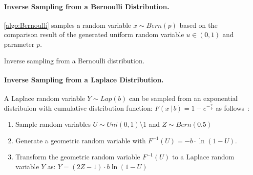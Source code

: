\paragraph{Inverse Sampling from a Bernoulli Distribution.}
\label{SamplingfromaBernoulliDistribution}
\autoref{algo:Bernoulli} samples a random variable $x\sim Bern\left(p\right) $ based on the comparison result of the generated uniform random variable $u \in \left(0,1\right) $ and parameter $p$.

\begin{algorithm}[tbh!]
    \centering
    \caption{Inverse sampling from a Bernoulli distribution.}
    \label{algo:Bernoulli}
\end{algorithm}
\FloatBarrier

\paragraph{Inverse Sampling from a Laplace Distribution.}
\label{algo:InverseTransform-BasedLaplaceSamplingMethod}
A Laplace random variable $Y\sim Lap\left(b\right) $ can be sampled from an exponential distribuion with cumulative distribution function: $F\left(x\,|\, b\right) =1-e^{-\frac{x}{b}}$ as follows~\cite{mironov2012significance}:
\begin{enumerate}
    \item Sample random variables $U\sim Uni\left(0,1\right)\setminus 1 $ and $Z \sim Bern\left(0.5\right) $
    \item Generate a geometric random variable with $  F^{-1}\left(U\right) =-b \cdot \ln\left(1-U\right)  $.
    \item Transform the geometric random variable $F^{-1}\left(U\right)$ to a Laplace random variable $Y$ as: $Y= \left(2Z-1\right)\cdot b \ln\left(1-U\right) $
\end{enumerate}



